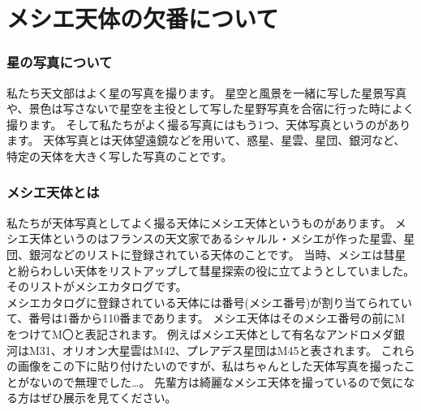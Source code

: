 \documentclass[../main]{subfiles}
\begin{document}
\chapter{メシエ天体の欠番について} %


\subsection*{星の写真について}
私たち天文部はよく星の写真を撮ります。
星空と風景を一緒に写した星景写真や、景色は写さないで星空を主役として写した星野写真を合宿に行った時によく撮ります。
そして私たちがよく撮る写真にはもう1つ、天体写真というのがあります。
天体写真とは天体望遠鏡などを用いて、惑星、星雲、星団、銀河など、特定の天体を大きく写した写真のことです。

\subsection*{メシエ天体とは}
私たちが天体写真としてよく撮る天体にメシエ天体というものがあります。
メシエ天体というのはフランスの天文家であるシャルル・メシエが作った星雲、星団、銀河などのリストに登録されている天体のことです。
当時、メシエは彗星と紛らわしい天体をリストアップして彗星探索の役に立てようとしていました。
そのリストがメシエカタログです。\\
メシエカタログに登録されている天体には番号(メシエ番号)が割り当てられていて、番号は1番から110番まであります。
メシエ天体はそのメシエ番号の前にMをつけてM〇と表記されます。
例えばメシエ天体として有名なアンドロメダ銀河はM31、オリオン大星雲はM42、プレアデス星団はM45と表されます。
これらの画像をこの下に貼り付けたいのですが、私はちゃんとした天体写真を撮ったことがないので無理でした…。
先輩方は綺麗なメシエ天体を撮っているので気になる方はぜひ展示を見てください。
\end{document}
